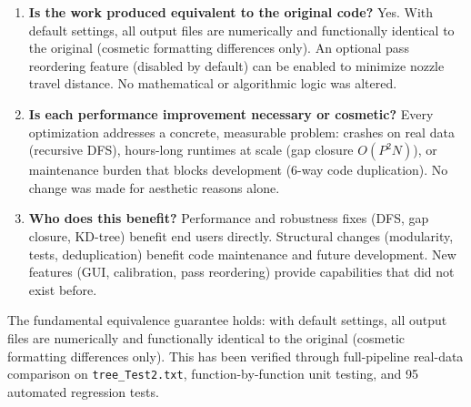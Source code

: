 \documentclass[11pt,a4paper]{article}
\begin{document}
\begin{enumerate}[leftmargin=2em]
    \item \textbf{Is the work produced equivalent to the original code?} Yes. With default settings, all output files are numerically and functionally identical to the original (cosmetic formatting differences only). An optional pass reordering feature (disabled by default) can be enabled to minimize nozzle travel distance. No mathematical or algorithmic logic was altered.

    \item \textbf{Is each performance improvement necessary or cosmetic?} Every optimization addresses a concrete, measurable problem: crashes on real data (recursive DFS), hours-long runtimes at scale (gap closure $O(P^2N)$), or maintenance burden that blocks development (6-way code duplication). No change was made for aesthetic reasons alone.

    \item \textbf{Who does this benefit?} Performance and robustness fixes (DFS, gap closure, KD-tree) benefit end users directly. Structural changes (modularity, tests, deduplication) benefit code maintenance and future development. New features (GUI, calibration, pass reordering) provide capabilities that did not exist before.
\end{enumerate}

The fundamental equivalence guarantee holds: with default settings, all output files are numerically and functionally identical to the original (cosmetic formatting differences only). This has been verified through full-pipeline real-data comparison on \texttt{tree\_Test2.txt}, function-by-function unit testing, and 95 automated regression tests.
\end{document}
